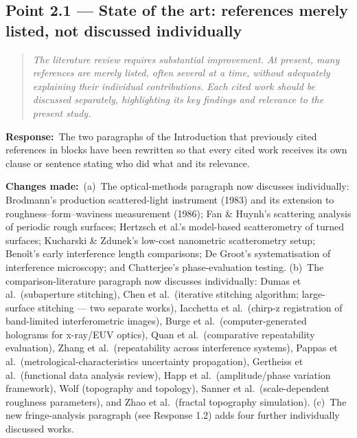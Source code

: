 \documentclass[11pt,a4paper]{article}
\newenvironment{reviewercomment}%
{\par\medskip\noindent\begin{quotation}\itshape\color{black!70}}%
{\end{quotation}\medskip}
\newcommand{\response}{\par\noindent\textbf{Response:}\ }
\newcommand{\changes}{\par\noindent\textbf{Changes made:}\ }
\begin{document}
\subsection*{Point 2.1 --- State of the art: references merely listed, not discussed individually}
\begin{reviewercomment}
The literature review requires substantial improvement. At present, many references are merely listed, often several at a time, without adequately explaining their individual contributions. Each cited work should be discussed separately, highlighting its key findings and relevance to the present study.
\end{reviewercomment}
\response The two paragraphs of the Introduction that previously cited references in blocks have been rewritten so that every cited work receives its own clause or sentence stating who did what and its relevance.
\changes (a)~The optical-methods paragraph now discusses individually: Brodmann's production scattered-light instrument (1983) and its extension to roughness--form--waviness measurement (1986); Fan \& Huynh's scattering analysis of periodic rough surfaces; Hertzsch et al.'s model-based scatterometry of turned surfaces; Kucharski \& Zdunek's low-cost nanometric scatterometry setup; Beno\^{i}t's early interference length comparisons; De Groot's systematisation of interference microscopy; and Chatterjee's phase-evaluation testing. (b)~The comparison-literature paragraph now discusses individually: Dumas et al.\ (subaperture stitching), Chen et al.\ (iterative stitching algorithm; large-surface stitching --- two separate works), Iacchetta et al.\ (chirp-z registration of band-limited interferometric images), Burge et al.\ (computer-generated holograms for x-ray/EUV optics), Quan et al.\ (comparative repeatability evaluation), Zhang et al.\ (repeatability across interference systems), Pappas et al.\ (metrological-characteristics uncertainty propagation), Gertheiss et al.\ (functional data analysis review), Happ et al.\ (amplitude/phase variation framework), Wolf (topography and topology), Sanner et al.\ (scale-dependent roughness parameters), and Zhao et al.\ (fractal topography simulation). (c)~The new fringe-analysis paragraph (see Response 1.2) adds four further individually discussed works.
\end{document}
